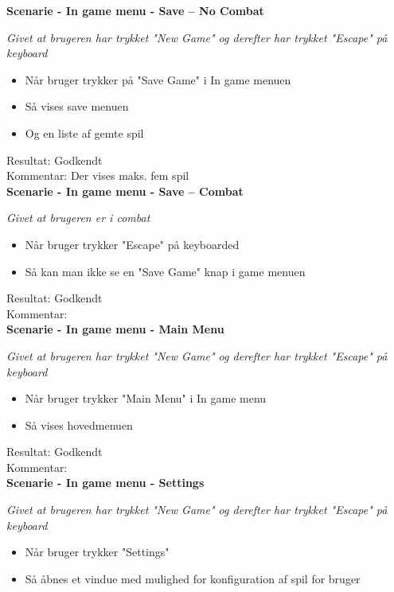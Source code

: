 \bf{Scenarie - In game menu - Save -- No Combat}

\it{Givet at brugeren har trykket "New Game" og derefter har trykket "Escape" på keyboard}

\begin{itemize}
  \item Når bruger trykker på "Save Game" i In game menuen
  \item Så vises save menuen
  \item Og en liste af gemte spil
\end{itemize}

Resultat: Godkendt\\
Kommentar: Der vises maks. fem spil\\

\bf{Scenarie - In game menu - Save -- Combat}

\it{Givet at brugeren er i combat}

\begin{itemize}
  \item Når bruger trykker "Escape" på keyboarded
  \item Så kan man ikke se en "Save Game" knap i game menuen
\end{itemize}

Resultat: Godkendt\\
Kommentar:\\

\bf{Scenarie - In game menu - Main Menu}

\it{Givet at brugeren har trykket "New Game" og derefter har trykket "Escape" på keyboard}

\begin{itemize}
  \item Når bruger trykker "Main Menu" i In game menu
  \item Så vises hovedmenuen
\end{itemize}

Resultat: Godkendt\\
Kommentar:\\

\bf{Scenarie - In game menu - Settings}

\it{Givet at brugeren har trykket "New Game" og derefter har trykket "Escape" på keyboard}

\begin{itemize}
  \item Når bruger trykker "Settings"
  \item Så åbnes et vindue med mulighed for konfiguration af spil for bruger
\end{itemize}


